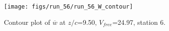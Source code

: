 \begin{figure}[H]
\centering
\texttt{[image: figs/run\_56/run\_56\_W\_contour]}
\caption{Contour plot of $\overline{w}$ at $z/c$=9.50, $V_{free}$=24.97, station 6.}
\label{fig:run_56_W_contour}
\end{figure}


